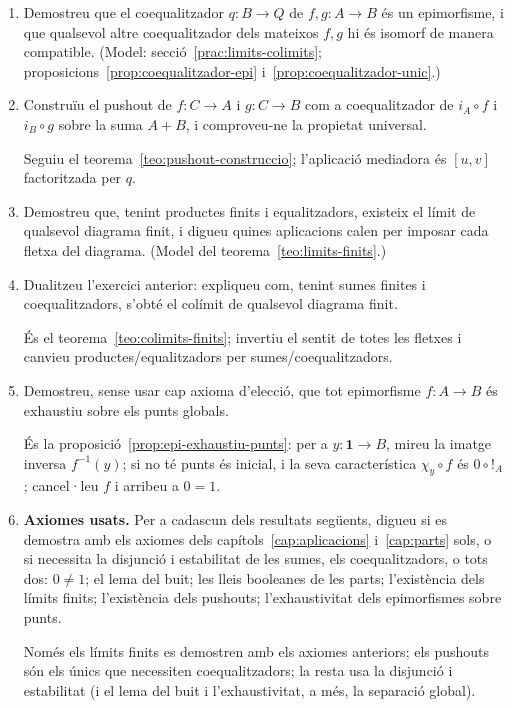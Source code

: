 \begin{enumerate}[resume]
  \item Demostreu que el coequalitzador \(q:B\to Q\) de \(f,g:A\to B\) és un epimorfisme, i que qualsevol altre coequalitzador dels mateixos \(f,g\) hi és isomorf de manera compatible. (Model: secció~\ref{prac:limits-colimits}; proposicions~\ref{prop:coequalitzador-epi} i~\ref{prop:coequalitzador-unic}.)

  \item Construïu el pushout de \(f:C\to A\) i \(g:C\to B\) com a coequalitzador de \(i_A\circ f\) i \(i_B\circ g\) sobre la suma \(A+B\), i comproveu-ne la propietat universal. \begin{indicacio}Seguiu el teorema~\ref{teo:pushout-construccio}; l'aplicació mediadora és \([u,v]\) factoritzada per \(q\).\end{indicacio}

  \item Demostreu que, tenint productes finits i equalitzadors, existeix el límit de qualsevol diagrama finit, i digueu quines aplicacions calen per imposar cada fletxa del diagrama. (Model del teorema~\ref{teo:limits-finits}.)

  \item Dualitzeu l'exercici anterior: expliqueu com, tenint sumes finites i coequalitzadors, s'obté el colímit de qualsevol diagrama finit. \begin{indicacio}És el teorema~\ref{teo:colimits-finits}; invertiu el sentit de totes les fletxes i canvieu productes/equalitzadors per sumes/coequalitzadors.\end{indicacio}

  \item Demostreu, sense usar cap axioma d'elecció, que tot epimorfisme \(f:A\to B\) és exhaustiu sobre els punts globals. \begin{indicacio}És la proposició~\ref{prop:epi-exhaustiu-punts}: per a \(y:\mathbf1\to B\), mireu la imatge inversa \(f^{-1}(y)\); si no té punts és inicial, i la seva característica \(\chi_y\circ f\) és \(0\circ{!}_A\); cancel·leu \(f\) i arribeu a \(0=1\).\end{indicacio}

  \item \textbf{Axiomes usats.} Per a cadascun dels resultats següents, digueu si es demostra amb els axiomes dels capítols~\ref{cap:aplicacions} i~\ref{cap:parts} sols, o si necessita la disjunció i estabilitat de les sumes, els coequalitzadors, o tots dos: \(0\ne1\); el lema del buit; les lleis booleanes de les parts; l'existència dels límits finits; l'existència dels pushouts; l'exhaustivitat dels epimorfismes sobre punts. \begin{indicacio}Només els límits finits es demostren amb els axiomes anteriors; els pushouts són els únics que necessiten coequalitzadors; la resta usa la disjunció i estabilitat (i el lema del buit i l'exhaustivitat, a més, la separació global).\end{indicacio}
\end{enumerate}
